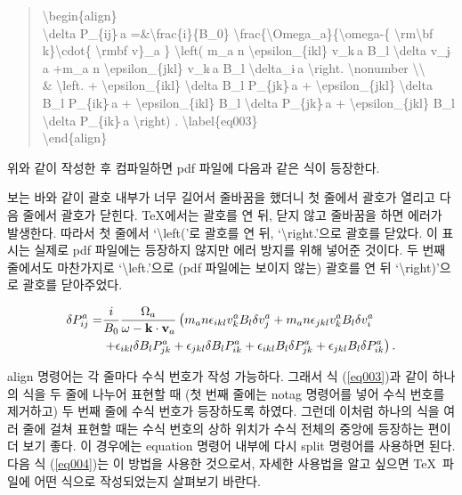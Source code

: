 \documentclass{gshs-report-v1.2}
\begin{document}
\begin{quote}
	{\textbackslash}begin\{align\}\\
	{\textbackslash}delta P\_\{ij\}$\hat{\ }$a 
	=\&{\textbackslash}frac\{i\}\{B\_0\} 
	{\textbackslash}frac\{{\textbackslash}Omega\_a\}\{{\textbackslash}omega-\{
	{\textbackslash}rm{\textbackslash}bf k\}{\textbackslash}cdot\{ 
	{\textbackslash}rm\linebreak{\textbackslash}bf v\}\_a \} 
	{\textbackslash}left( m\_a n {\textbackslash}epsilon\_\{ikl\} 
	v\_k$\hat{\ }$a B\_l {\textbackslash}delta v\_j$\hat{\ }$a +m\_a n 
	{\textbackslash}epsilon\_\{jkl\} v\_k$\hat{\ }$a B\_l 
	{\textbackslash}delta\_i$\hat{\ }$a {\textbackslash}right. 
	{\textbackslash}nonumber {\textbackslash}{\textbackslash} \\
	\& {\textbackslash}left. + {\textbackslash}epsilon\_\{ikl\} {\textbackslash}delta B\_l P\_\{jk\}$\hat{\ }$a + {\textbackslash}epsilon\_\{jkl\} {\textbackslash}delta B\_l P\_\{ik\}$\hat{\ }$a + {\textbackslash}epsilon\_\{ikl\} B\_l {\textbackslash}delta P\_\{jk\}$\hat{\ }$a + {\textbackslash}epsilon\_\{jkl\} B\_l {\textbackslash}delta P\_\{ik\}$\hat{\ }$a {\textbackslash}right) . {\textbackslash}label\{eq003\} \\
	{\textbackslash}end\{align\}
\end{quote}
위와 같이 작성한 후 컴파일하면 pdf 파일에 다음과 같은 식이 등장한다.

보는 바와 같이 괄호 내부가 너무 길어서 줄바꿈을 했더니 첫 줄에서 괄호가 열리고 다음 줄에서 괄호가 닫힌다. \TeX 에서는 괄호를 연 뒤, 닫지 않고 줄바꿈을 하면 에러가 발생한다. 따라서 첫 줄에서 `{\textbackslash}left('로 괄호를 연 뒤, `{\textbackslash}right.'으로 괄호를 닫았다. 이 표시는 실제로 pdf 파일에는 등장하지 않지만 에러 방지를 위해 넣어준 것이다. 두 번째 줄에서도 마찬가지로 `{\textbackslash}left.'으로 (pdf 파일에는 보이지 않는) 괄호를 연 뒤 `{\textbackslash}right)'으로 괄호를 닫아주었다.

\begin{align}
	\delta P_{ij}^a =&\frac{i}{B_0} \frac{\Omega_a}{\omega-{\rm\bf 
			k}\cdot{\rm\bf v}_a} \left( m_a n \epsilon_{ikl} v_k^a B_l \delta v_j^a 
	+m_a n \epsilon_{jkl} v_k^a B_l \delta v_i^a \right. \nonumber\\
	&\left. +\epsilon_{ikl} \delta B_l P_{jk}^a +\epsilon_{jkl} \delta B_l 
	P_{ik}^a +\epsilon_{ikl} B_l \delta P_{jk}^a +\epsilon_{jkl} B_l \delta 
	P_{ik}^a \right) . \label{eq003}
\end{align}

align 명령어는 각 줄마다 수식 번호가 작성 가능하다. 그래서 식 (\ref{eq003})과 같이 하나의 식을 두 줄에 나누어 표현할 때 (첫 번째 줄에는 notag 명령어를 넣어 수식 번호를 제거하고) 두 번째 줄에 수식 번호가 등장하도록 하였다. 그런데 이처럼 하나의 식을 여러 줄에 걸쳐 표현할 때는 수식 번호의 상하 위치가 수식 전체의 중앙에 등장하는 편이 더 보기 좋다. 이 경우에는 equation 명령어 내부에 다시 split 명령어를 사용하면 된다. 다음 식 (\ref{eq004})는 이 방법을 사용한 것으로서, 자세한 사용법을 알고 싶으면 \TeX\ 파일에 어떤 식으로 작성되었는지 살펴보기 바란다.
\end{document}
